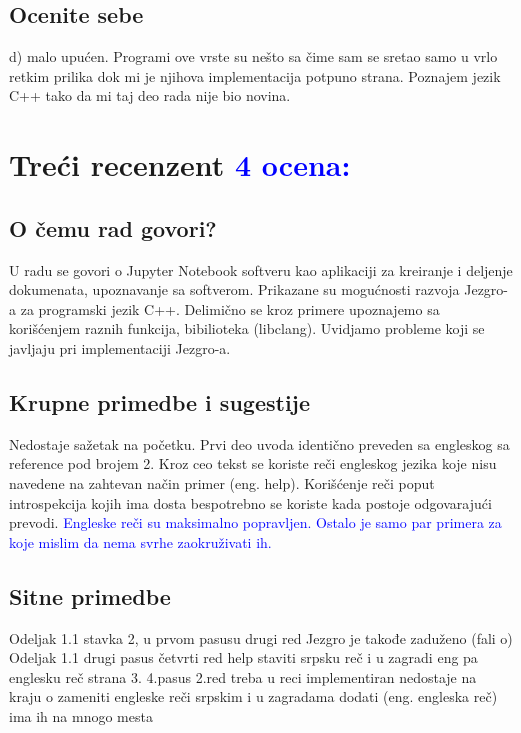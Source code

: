 \documentclass[a4paper]{report}
\newcommand{\odgovor}[1]{\textcolor{blue}{#1}}
\begin{document}
\section{Ocenite sebe}

d) malo upućen.
Programi ove vrste su nešto sa čime sam se sretao samo u vrlo retkim prilika dok mi je njihova implementacija potpuno strana. Poznajem jezik C++ tako da mi taj deo rada nije bio novina.


\chapter{Treći recenzent \odgovor{4 ocena:} }

\section{O čemu rad govori?}
U radu se govori o Jupyter Notebook softveru kao aplikaciji za kreiranje i deljenje dokumenata, upoznavanje sa softverom. Prikazane su mogućnosti razvoja Jezgro-a za programski jezik C++.
Delimično se kroz primere upoznajemo sa korišćenjem raznih funkcija, bibilioteka (libclang). Uvidjamo probleme koji se javljaju pri implementaciji Jezgro-a.


\section{Krupne primedbe i sugestije}
Nedostaje sažetak na početku.
Prvi deo uvoda identično preveden sa engleskog sa reference pod brojem 2.
Kroz ceo tekst se koriste reči engleskog jezika koje nisu navedene na zahtevan način primer (eng. help).
Korišćenje reči poput introspekcija kojih ima dosta bespotrebno se koriste kada postoje odgovarajući prevodi.
\odgovor{
 Engleske reči su maksimalno popravljen. Ostalo je samo par primera za koje mislim da nema svrhe zaokruživati ih. 
}

\section{Sitne primedbe}
Odeljak 1.1 stavka 2, u prvom pasusu drugi red Jezgro je takođe zaduženo (fali o)
Odeljak 1.1 drugi pasus četvrti red help staviti srpsku reč i u zagradi eng pa englesku reč
strana 3. 4.pasus 2.red treba u reci implementiran nedostaje na kraju o
zameniti engleske reči srpskim i u zagradama dodati (eng. engleska reč) ima ih na mnogo mesta
\end{document}

